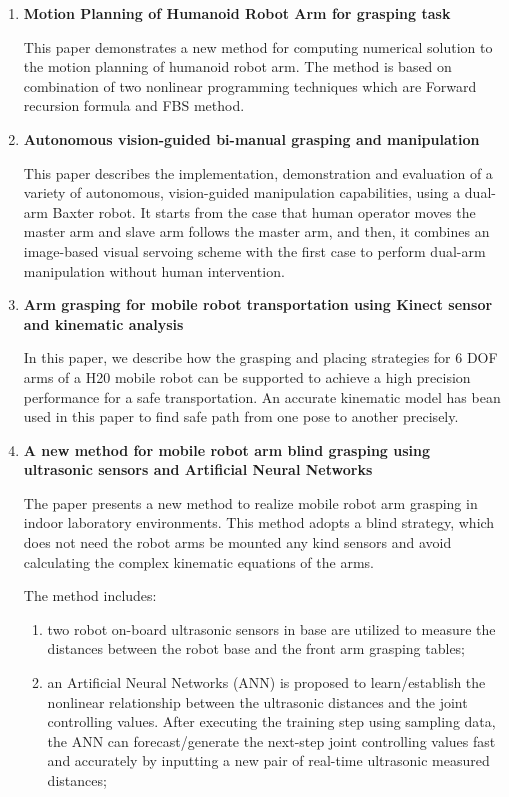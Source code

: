\documentclass[paper=a4, fontsize=11pt]{scrartcl} %
\numberwithin{equation}{section} %
\numberwithin{figure}{section} %
\numberwithin{table}{section} %
\begin{document}
\begin{enumerate}
\item \textbf{Motion Planning of Humanoid Robot Arm for grasping task}

This paper demonstrates a new method for computing numerical solution to the motion planning of humanoid robot arm. The method is based on combination of two nonlinear programming techniques which are Forward recursion formula and FBS method. 

\item \textbf{Autonomous vision-guided bi-manual grasping and manipulation}

This paper describes the implementation, demonstration and evaluation of a variety of autonomous, vision-guided manipulation capabilities, using a dual-arm Baxter robot. It starts from the case that human operator  moves the master arm and slave arm follows the master arm, and then, it combines an image-based visual servoing scheme with the first case to perform dual-arm manipulation without human intervention. 
  
\item \textbf{Arm grasping for mobile robot transportation using Kinect sensor and kinematic analysis}

In this paper, we describe how the grasping and placing strategies for 6 DOF arms of a H20 mobile robot can be supported to achieve a high precision performance for a safe transportation. An accurate kinematic model has bean used in this paper to find safe path from one pose to another precisely.

\item \textbf{A new method for mobile robot arm blind grasping using ultrasonic sensors and Artificial Neural Networks}

The paper presents a new method to realize mobile robot arm grasping in indoor laboratory environments. This
method adopts a blind strategy, which does not need the robot arms be mounted any kind sensors and avoid calculating the complex kinematic equations of the arms.

The method includes:
\begin{enumerate}
\item two robot on-board ultrasonic sensors in base are utilized to measure the distances between the robot base and the front arm grasping tables; 

\item an Artificial Neural Networks (ANN) is proposed to learn/establish the nonlinear relationship between
the ultrasonic distances and the joint controlling values. After executing the training step using sampling data, the ANN can forecast/generate the next-step joint controlling values fast and
accurately by inputting a new pair of real-time ultrasonic measured distances; 


\end{enumerate}
\end{enumerate}
\end{document}
